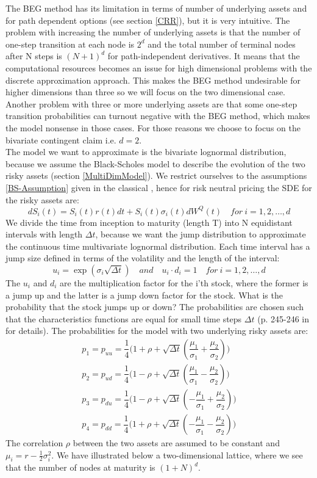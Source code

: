 The BEG method has its limitation in terms of number of underlying assets and for path dependent options (see section \ref{CRR}), but it is very intuitive. The problem with increasing the number of underlying assets is that the number of one-step transition at each node is $2^d$ and the total number of terminal nodes after N steps is $(N+1)^d$ for path-independent derivatives. It means that the computational resources becomes an issue for high dimensional problems with the discrete approximation approach. This makes the BEG method undesirable for higher dimensions than three so we will focus on the two dimensional case. Another problem with three or more underlying assets are that some one-step transition probabilities can turnout negative with the BEG method, which makes the model nonsense in those cases. For those reasons we choose to focus on the bivariate contingent claim i.e. $d=2$. \\

The model we want to approximate is the bivariate lognormal distribution, because we assume the Black-Scholes model to describe the evolution of the two risky assets (section \ref{MultiDimModel}). We restrict ourselves to the assumptions \ref{BS-Assumption} given in the classical \parencite{B-S-Paper}, hence for risk neutral pricing the SDE for the risky assets are:
$$dS_i(t)=S_i(t)r(t)dt+S_i(t)\sigma_i(t)dW^Q(t) \quad for \ i=1,2,\ldots,d$$
We divide the time from inception to maturity (length T) into N equidistant intervals with length $\Delta t$, because we want the jump distribution to approximate the continuous time multivariate lognormal distribution. Each time interval has a jump size defined in terms of the volatility and the length of the interval:
$$u_i=\exp(\sigma_i \sqrt{\Delta t}) \quad and \quad u_i \cdot d_i = 1 \quad for \ i=1,2,\ldots,d $$
The $u_i$ and $d_i$ are the multiplication factor for the i'th stock, where the former is a jump up and the latter is a jump down factor for the stock. What is the probability that the stock jumps up or down? The probabilities are chosen such that the characteristics functions are equal for small time steps $\Delta t$ (p. 245-246 in \parencite{BEG} for details). The probabilities for the model with two underlying risky assets are:
\begin{equation}
\begin{split}
p_1=p_{uu}=\dfrac{1}{4}\bigg( 1+\rho + \sqrt{\Delta t}(\dfrac{\mu_1}{\sigma_1} + \dfrac{\mu_2}{\sigma_2}) \bigg)\\
p_2=p_{ud}=\dfrac{1}{4}\bigg( 1-\rho + \sqrt{\Delta t}(\dfrac{\mu_1}{\sigma_1} - \dfrac{\mu_2}{\sigma_2}) \bigg)\\
p_3=p_{du}=\dfrac{1}{4}\bigg( 1-\rho + \sqrt{\Delta t}(-\dfrac{\mu_1}{\sigma_1} + \dfrac{\mu_2}{\sigma_2}) \bigg)\\
p_4=p_{dd}=\dfrac{1}{4}\bigg( 1+\rho + \sqrt{\Delta t}(-\dfrac{\mu_1}{\sigma_1} - \dfrac{\mu_2}{\sigma_2}) \bigg)
\end{split}
\end{equation} 
The correlation $\rho$ between the two assets are assumed to be constant and $\mu_i=r-\frac{1}{2}\sigma_i^2$. We have illustrated below a two-dimensional lattice, where we see that the number of nodes at maturity is $(1+N)^d$. 

